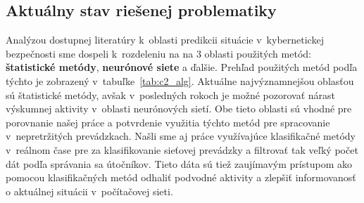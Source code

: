 \documentclass[thesismargins, thesislinespacing, openright, upjsfrontpage]{rnthesis}
\begin{document}

\subsection{Aktuálny stav riešenej problematiky}

Analýzou dostupnej literatúry k~oblasti predikcii situácie v~kybernetickej bezpečnosti sme dospeli k~rozdeleniu na na 3 oblasti použitých metód:
\textbf{štatistické metódy}, \textbf{neurónové siete} a ďalšie. Prehľad použitých metód podľa týchto je zobrazený v~tabuľke~\ref{tab:c2_alg}. Aktuálne najvýznamnejšou oblasťou sú štatistické metódy, avšak v~posledných rokoch je možné pozorovať nárast výskumnej aktivity v~oblasti neurónových sietí. Obe tieto oblasti sú vhodné pre porovnanie našej práce a potvrdenie využitia týchto metód pre spracovanie v~nepretržitých prevádzkach. Našli sme aj práce využívajúce klasifikačné metódy v~reálnom čase pre za klasifikovanie sieťovej prevádzky a filtrovať tak veľký počet dát podľa správania sa útočníkov. Tieto dáta sú tiež zaujímavým prístupom ako pomocou klasifikačných metód odhaliť podvodné aktivity a zlepšiť informovanosť o aktuálnej situácii v~počítačovej sieti.
\end{document}
